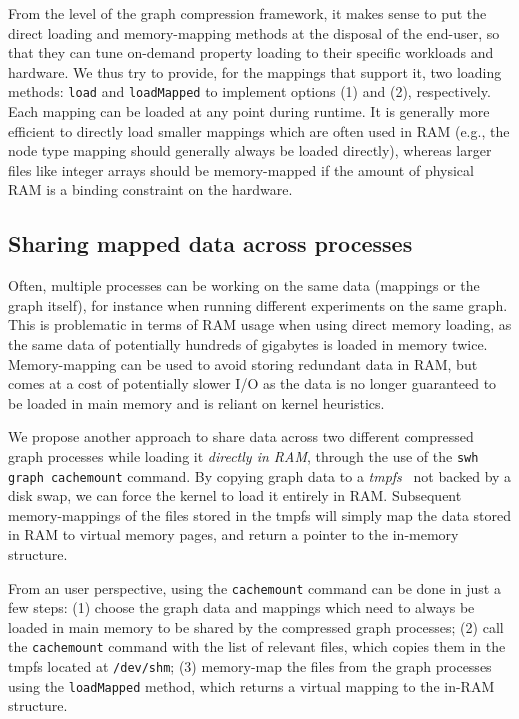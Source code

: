 From the level of the graph compression framework, it makes sense to put the
direct loading and memory-mapping methods at the disposal of the end-user, so
that they can tune on-demand property loading to their specific workloads and
hardware. We thus try to provide, for the mappings that support it, two loading
methods: \texttt{load} and \texttt{loadMapped} to implement options (1) and
(2), respectively.
Each mapping can be loaded at any point during runtime. It is generally more
efficient to directly load smaller mappings which are often used in RAM (e.g.,
the node type mapping should generally always be loaded directly), whereas
larger files like integer arrays should be memory-mapped if the amount of
physical RAM is a binding constraint on the hardware.

\subsection{Sharing mapped data across processes}%
\label{sec:cachemount}

Often, multiple processes can be working on the same data (mappings or the
graph itself), for instance when running different experiments on the same
graph. This is problematic in terms of RAM usage when using direct memory
loading, as the same data of potentially hundreds of gigabytes is loaded in
memory twice. Memory-mapping can be used to avoid storing redundant data in
RAM, but comes at a cost of potentially slower I/O as the data is no longer
guaranteed to be loaded in main memory and is reliant on kernel heuristics.

We propose another approach to share data across two different compressed graph
processes while loading it \emph{directly in RAM}, through the use of the
\texttt{swh graph cachemount} command. By copying graph data to a
\emph{tmpfs}~\cite{snyder1990tmpfs} not backed by a disk swap, we can force the
kernel to load it entirely in RAM. Subsequent memory-mappings of the files
stored in the tmpfs will simply map the data stored in RAM to virtual memory
pages, and return a pointer to the in-memory structure.

From an user perspective, using the \texttt{cachemount} command can be done in
just a few steps: (1) choose the graph data and mappings which need to always
be loaded in main memory to be shared by the compressed graph processes; (2)
call the \texttt{cachemount} command with the list of relevant files, which
copies them in the tmpfs located at \texttt{/dev/shm}; (3) memory-map the files
from the graph processes using the \texttt{loadMapped} method, which returns a
virtual mapping to the in-RAM structure.

